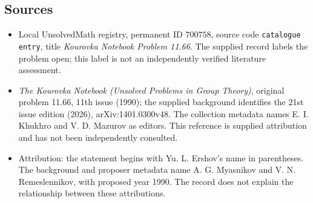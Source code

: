 \documentclass[11pt]{article}
\begin{document}
\subsection{Sources}
\begin{itemize}
\item Local UnsolvedMath registry, permanent ID \(700758\), source code \texttt{catalogue entry}, title \emph{Kourovka Notebook Problem 11.66}. The supplied record labels the problem open; this label is not an independently verified literature assessment.
\item \emph{The Kourovka Notebook (Unsolved Problems in Group Theory)}, original problem 11.66, 11th issue (1990); the supplied background identifies the 21st issue edition (2026), arXiv:1401.0300v48. The collection metadata names E. I. Khukhro and V. D. Mazurov as editors. This reference is supplied attribution and has not been independently consulted.
\item Attribution: the statement begins with Yu. L. Ershov's name in parentheses. The background and proposer metadata name A. G. Myasnikov and V. N. Remeslennikov, with proposed year 1990. The record does not explain the relationship between these attributions.
\end{itemize}
\end{document}
